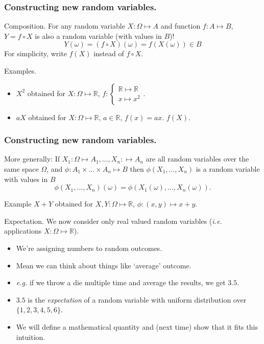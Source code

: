 \documentclass{beamer}
\begin{document}
\begin{frame}
  \frametitle{Constructing new random variables.}
  \begin{block}{Composition.}
    For any random variable $X: \Omega \mapsto A$ and function $f: A \mapsto B$, $Y = f \circ X$ is also a random variable (with values in $B$)!
    \[Y(\omega) = (f \circ X) (\omega) = f(X(\omega)) \in B\]
    For simplicity, write $f(X)$ instead of $f \circ X$. 
  \end{block}
  \begin{exampleblock}{Examples.}
    \begin{itemize}
    \item $X^2$ obtained for $X: \Omega \mapsto \mathbb{R}$, $f: \left \{ \begin{array}{l} \mathbb{R} \mapsto \mathbb{R}\\ x \mapsto x^2 \end{array} \right .$.
    \item $aX$ obtained for $X: \Omega \mapsto \mathbb{R}$, $a \in \mathbb{R}$, $f(x) = a x$. $f(X)$.
    \end{itemize}
  \end{exampleblock}
\end{frame}

\begin{frame}
  \frametitle{Constructing new random variables.}
  \begin{block}{More generally:}
    If $X_1 : \Omega \mapsto A_1, \dots, X_n: \mapsto A_n$ are all random variables over the same space $\Omega$, and $\phi: A_1 \times \dots \times A_n \mapsto B$ then $\phi(X_1, \dots, X_n)$ is a random variable with values in $B$
    \[\phi(X_1, \dots, X_n)(\omega) = \phi(X_1(\omega), \dots, X_n(\omega)).\]
  \end{block}

  \begin{exampleblock}{Example}
     $X + Y$ obtained for $X, Y: \Omega \mapsto \mathbb{R}$, $\phi: (x,y) \mapsto x + y$.
  \end{exampleblock}
  
  
\end{frame}

\begin{frame}{Expectation.}
  We now consider only real valued random variables (\emph{i.e.} applications $X: \Omega \mapsto \mathbb{R}$).

  \begin{itemize}
  \item We're assigning numbers to random outcomes.
  \item Mean we can think about things like `average' outcome.
  \item \emph{e.g.} if we throw a die multiple time and average the results, we get $3.5$.
  \item $3.5$ is the \emph{expectation} of a random variable with uniform distribution over $\{1,2,3,4,5,6\}$.
  \item We will define a mathematical quantity and (next time) show that it fits this intuition.
  \end{itemize}
\end{frame}
\end{document}
